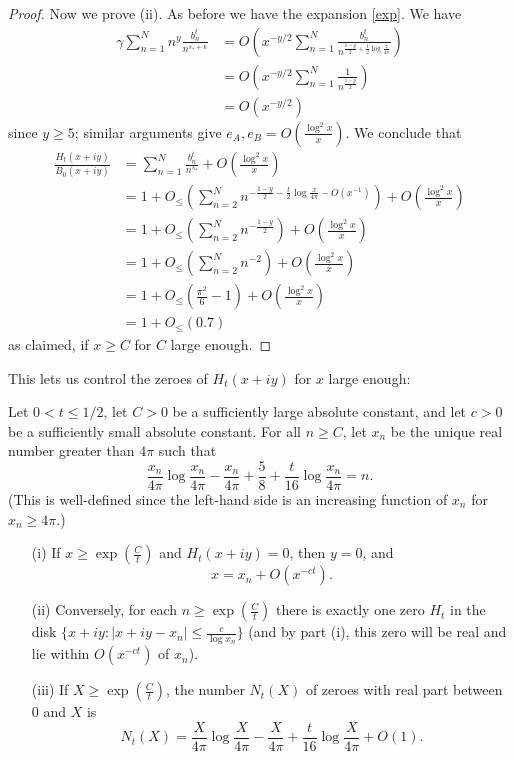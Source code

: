\begin{proof}
Now we prove (ii).  As before we have the expansion \eqref{exp}.  We have
\begin{align*}
\gamma \sum_{n=1}^N n^y \frac{b_n^t}{n^{\overline{s_*} + \kappa}} &= O( x^{-y/2} \sum_{n=1}^N \frac{b_n^t}{n^{\frac{1-y}{2} + \frac{t}{2} \log \frac{x}{4\pi}}} ) \\
&= O( x^{-y/2} \sum_{n=1}^N \frac{1}{n^{\frac{1-y}{2}}} ) \\
&= O(x^{-y/2})
\end{align*}
since $y \geq 5$; similar arguments give $e_A, e_B = O( \frac{\log^2 x}{x} )$.  We conclude that
\begin{align*}
\frac{H_t(x+iy)}{B_0(x+iy)} &= \sum_{n=1}^N \frac{b_n^t}{n^{s_*}} + O( \frac{\log^2 x}{x} ) \\
&= 1 + O_{\leq}( \sum_{n=2}^N n^{-\frac{1-y}{2} - \frac{t}{2} \log \frac{x}{4\pi} - O(x^{-1})} ) + O( \frac{\log^2 x}{x} ) \\
&= 1 + O_{\leq}( \sum_{n=2}^N n^{-\frac{1-y}{2}} ) + O( \frac{\log^2 x}{x} ) \\
&= 1 + O_{\leq}( \sum_{n=2}^N n^{-2} ) + O( \frac{\log^2 x}{x} ) \\
&= 1 + O_{\leq}( \frac{\pi^2}{6} - 1 ) + O( \frac{\log^2 x}{x} ) \\
&= 1 + O_{\leq}( 0.7 )
\end{align*}
as claimed, if $x \geq C$ for $C$ large enough.
\end{proof}

This lets us control the zeroes of $H_t(x+iy)$ for $x$ large enough:

\begin{corollary}  Let $0 < t \leq 1/2$, let $C>0$ be a sufficiently large absolute constant, and let $c>0$ be a sufficiently small absolute constant.  For all $n \geq C$, let $x_n$ be the unique real number greater than $4\pi$ such that
$$ \frac{x_n}{4\pi} \log \frac{x_n}{4\pi} - \frac{x_n}{4\pi} + \frac{5}{8} + \frac{t}{16} \log \frac{x_n}{4\pi} = n.$$
(This is well-defined since the left-hand side is an increasing function of $x_n$ for $x_n \geq 4\pi$.)
\begin{itemize}
\item[(i)]  If $x \geq \exp(\frac{C}{t})$ and $H_t(x+iy)=0$, then $y=0$, and
$$ x = x_n + O(x^{-ct}).$$  
\item[(ii)]  Conversely, for each $n \geq \exp( \frac{C}{t} )$ there is exactly one zero $H_t$ in the disk $\{ x+iy: |x+iy - x_n| \leq \frac{c}{\log x_n} \}$ (and by part (i), this zero will be real and lie within $O(x^{-ct})$ of $x_n$).
\item[(iii)]  If $X \geq \exp(\frac{C}{t})$, the number $N_t(X)$ of zeroes with real part between $0$ and $X$ is
$$ N_t(X) = \frac{X}{4\pi} \log \frac{X}{4\pi} - \frac{X}{4\pi} + \frac{t}{16} \log \frac{X}{4\pi} + O(1).$$
\end{itemize}
\end{corollary}

